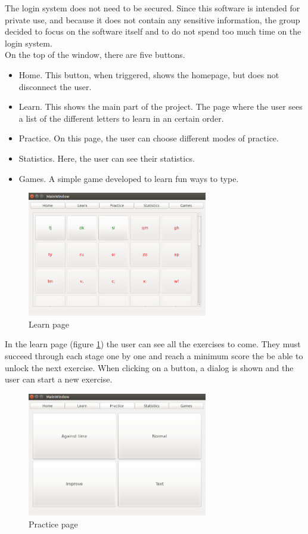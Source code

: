 The login system does not need to be secured. Since this software is intended for private use, and because it does not contain any sensitive information, the group decided to focus on the software itself and to do not spend too much time on the login system. \\
On the top of the window, there are five buttons.
\begin{itemize}
	\item Home. This button, when triggered, shows the homepage, but does not disconnect the user.
	\item Learn. This shows the main part of the project. The page where the user sees a list of the different letters to learn in an certain order.
	\item Practice. On this page, the user can choose different modes of practice.
	\item Statistics. Here, the user can see their statistics.
	\item Games. A simple game developed to learn fun ways to type.
\end{itemize}


\begin{figure}[H]
	\centering
	\includegraphics[width=0.7\textwidth]{images/page-learn.png}
	\caption{Learn page}
	\label{page-learn}
\end{figure}

In the learn page (figure \ref{page-learn}) the user can see all the exercises to come. They must succeed through each stage one by one and reach a minimum score the be able to unlock the next exercise. When clicking on a button, a dialog is shown and the user can start a new exercise.

\begin{figure}[H]
	\centering
	\includegraphics[width=0.7\textwidth]{images/page-practice.png}
	 \caption{Practice page}
	 \label{page-practice}
\end{figure}

